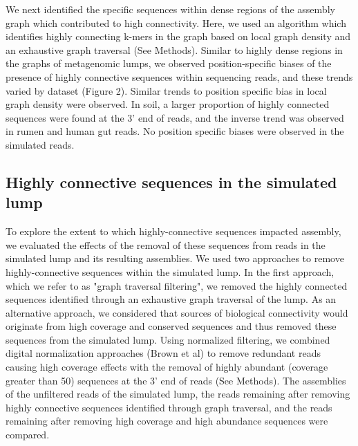 \documentclass[11pt]{article} %
\begin{document}
We next identified the specific sequences within dense regions of the assembly graph which contributed to high connectivity.  Here, we used an algorithm which identifies highly connecting k-mers in the graph based on local graph density and an exhaustive graph traversal (See Methods).  Similar to highly dense regions in the graphs of metagenomic lumps, we observed position-specific biases of the presence of highly connective sequences within sequencing reads, and these trends varied by dataset (Figure 2).  Similar trends to position specific bias in local graph density were observed.  In soil, a larger proportion of highly connected sequences were found at the 3' end of reads, and the inverse trend was observed in rumen and human gut reads.  No position specific biases were observed in the simulated reads.

\subsection{Highly connective sequences in the simulated lump}

To explore the extent to which highly-connective sequences impacted assembly, we evaluated the effects of the removal of these sequences from reads in the simulated lump and its resulting assemblies.  We used two approaches to remove highly-connective sequences within the simulated lump.  In the first approach, which we refer to as "graph traversal filtering", we removed the highly connected sequences identified through an exhaustive graph traversal of the lump.  As an alternative approach, we considered that sources of biological connectivity would originate from high coverage and conserved sequences and thus removed these sequences from the simulated lump.  Using normalized filtering, we combined digital normalization approaches (Brown et al) to remove redundant reads causing high coverage effects with the removal of highly abundant (coverage greater than 50) sequences at the 3' end of reads (See Methods).  The assemblies of the unfiltered reads of the simulated lump, the reads remaining after removing highly connective sequences identified through graph traversal, and the reads remaining after removing high coverage and high abundance sequences were compared.  
\end{document}
